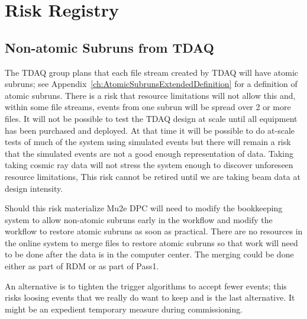 \chapter{Risk Registry}
\label{ch:RiskRegistry}

\section{Non-atomic Subruns from TDAQ}
\label{sec:Risk:NonAtomicSubruns}

The TDAQ group plans that each file stream created by TDAQ will have atomic subruns;
see Appendix~\ref{ch:AtomicSubrunsExtendedDefinition} for a definition of atomic subruns.
There is a risk that resource limitations will not allow this and, within some file streams,
events from one subrun will be spread over 2 or more files.  It will not be possible
to test the TDAQ design at scale until all equipment has been purchased and deployed.
At that time it will be possible to do at-scale tests of much of the system using simulated events
but there will remain a risk that the simulated events are not a good enough representation of data.
Taking taking cosmic ray data will not stress the system enough to discover unforeseen resource limitations,
This risk cannot be retired until we are taking beam data at design intensity.

Should this risk materialize Mu2e DPC will need to modify the bookkeeping
system to allow non-atomic subruns early in the workflow and modify the workflow
to restore atomic subruns as soon as practical.
There are no resources in the online system to merge files to restore atomic subruns
so that work will need to be done after the data is in the computer center.
The merging could be done either as part of RDM or as part of Pass1.

An alternative is to tighten the trigger algorithms to accept fewer events;
this risks loosing events that we really do want to keep and is the last alternative.
It might be an expedient temporary measure during commissioning.
